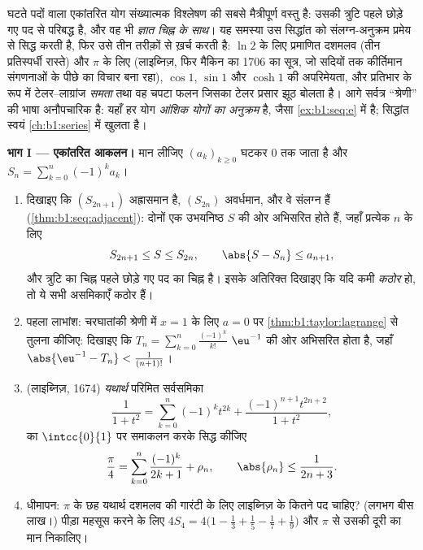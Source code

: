 \begin{problem}
\label{pb:b1:taylor:1}
घटते पदों वाला एकांतरित योग संख्यात्मक विश्लेषण की सबसे मैत्रीपूर्ण वस्तु
है: उसकी त्रुटि पहले छोड़े गए पद से परिबद्ध है, और वह भी \emph{ज्ञात चिह्न
के साथ}। यह समस्या उस सिद्धांत को संलग्न-अनुक्रम प्रमेय से सिद्ध करती है,
फिर उसे तीन तरीक़ों से ख़र्च करती है: $\ln 2$ के लिए प्रमाणित दशमलव (तीन
प्रतिस्पर्धी रास्ते) और $\pi$ के लिए (लाइब्निज़, फिर मैकिन का 1706 का सूत्र,
जो सदियों तक कीर्तिमान संगणनाओं के पीछे का विचार बना रहा), $\cos 1$, $\sin
1$ और $\cosh 1$ की अपरिमेयता, और प्रतिभार के रूप में टेलर--लाग्रांज
\emph{समता} तथा वह चपटा फलन जिसका टेलर प्रसार झूठ बोलता है। आगे
सर्वत्र ``श्रेणी'' की भाषा अनौपचारिक है: यहाँ हर योग \emph{आंशिक योगों का
अनुक्रम} है, जैसा \cref{ex:b1:seq:e} में है; सिद्धांत स्वयं
\cref{ch:b1:series} में खुलता है।

\medskip \noindent\textbf{भाग I --- एकांतरित आकलन।} मान लीजिए $(a_k)_{k \geq
0}$ घटकर $0$ तक जाता है और $S_n = \sum_{k=0}^{n} (-1)^k a_k$।
\begin{enumerate}
  \item दिखाइए कि $(S_{2n+1})$ अह्रासमान है, $(S_{2n})$ अवर्धमान, और वे
  संलग्न हैं (\cref{thm:b1:seq:adjacent}): दोनों एक उभयनिष्ठ $S$ की ओर
  अभिसरित होते हैं, जहाँ प्रत्येक $n$ के लिए
        \[
        S_{2n+1} \leq S \leq S_{2n},
        \qquad
        \abs{S - S_n} \leq a_{n+1} ,
        \]
        और त्रुटि का चिह्न पहले छोड़े गए पद का चिह्न है। इसके अतिरिक्त
        दिखाइए कि यदि कमी \emph{कठोर} हो, तो ये सभी असमिकाएँ कठोर हैं।
  \item पहला लाभांश: चरघातांकी श्रेणी में $x = 1$ के लिए $a = 0$ पर
  \cref{thm:b1:taylor:lagrange} से तुलना कीजिए: दिखाइए कि $T_n =
  \sum_{k=0}^{n} \frac{(-1)^k}{k!}$ $\eu^{-1}$ की ओर अभिसरित होता है, जहाँ
  $\abs{\eu^{-1} - T_n} < \frac{1}{(n+1)!}$।
  \item (लाइब्निज़, 1674) \emph{यथार्थ} परिमित सर्वसमिका
        \[
        \frac{1}{1 + t^2} = \sum_{k=0}^{n} (-1)^k t^{2k}
        + \frac{(-1)^{n+1} t^{2n+2}}{1 + t^2} ,
        \]
        का $\intcc{0}{1}$ पर समाकलन करके सिद्ध कीजिए
        \[
        \frac\pi4 = \sum_{k=0}^{n} \frac{(-1)^k}{2k+1} + \rho_n,
        \qquad \abs{\rho_n} \leq \frac{1}{2n+3} .
        \]
  \item धीमापन: $\pi$ के छह यथार्थ दशमलव की गारंटी के लिए लाइब्निज़ के कितने
  पद चाहिए? (लगभग बीस लाख।) पीड़ा महसूस करने के लिए $4 S_4 = 4\bigl(1 -
  \frac13 + \frac15 - \frac17 + \frac19\bigr)$ और $\pi$ से उसकी दूरी का मान
  निकालिए।
\end{enumerate}


\end{problem}
